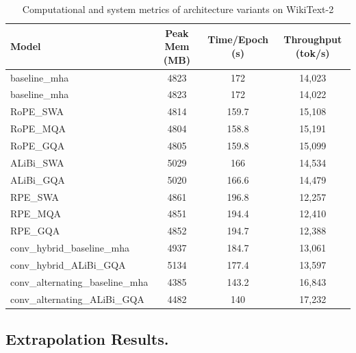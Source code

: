 \documentclass[10pt]{article}
\theoremstyle{plain}
\begin{document}
  \begin{table}[H]
  \centering
\caption{Computational and system metrics of architecture variants on WikiText-2}
\label{tab:core_ml_results_sys}
\begin{tabular}{lccc}
\toprule
Model & Peak Mem (MB) & Time/Epoch (s) & Throughput (tok/s) \\
\midrule
baseline\_mha & 4823 & 172 & 14,023 \\
baseline\_mha & 4823 & 172 & 14,022 \\
RoPE\_SWA & 4814 & 159.7 & 15,108 \\
RoPE\_MQA & 4804 & 158.8 & 15,191 \\
RoPE\_GQA & 4805 & 159.8 & 15,099 \\
ALiBi\_SWA & 5029 & 166 & 14,534 \\
ALiBi\_GQA & 5020 & 166.6 & 14,479 \\
RPE\_SWA & 4861 & 196.8 & 12,257 \\
RPE\_MQA & 4851 & 194.4 & 12,410 \\
RPE\_GQA & 4852 & 194.7 & 12,388 \\
conv\_hybrid\_baseline\_mha & 4937 & 184.7 & 13,061 \\
conv\_hybrid\_ALiBi\_GQA & 5134 & 177.4 & 13,597 \\
conv\_alternating\_baseline\_mha & 4385 & 143.2 & 16,843 \\
conv\_alternating\_ALiBi\_GQA & 4482 & 140 & 17,232 \\
\bottomrule
\end{tabular}
\end{table}

\newpage

\subsection{Extrapolation Results.}
\end{document}
